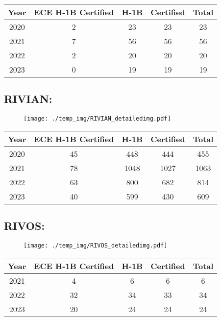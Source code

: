 \documentclass{article}%
\begin{document}
%
\begin{longtable}{c|c|c|c|c}%
\hline%
Year&ECE H{-}1B Certified&H{-}1B&Certified&Total\\%
\hline%
2020&2&23&23&23\\%
\hline%
2021&7&56&56&56\\%
\hline%
2022&2&20&20&20\\%
\hline%
2023&0&19&19&19\\%
\hline%
\end{longtable}

%
\newpage%
\subsection{RIVIAN:}%
\label{subsec:RIVIAN}%
\label{RIVIANdetailed}%


\begin{figure}[htbp]%
\centering%
\texttt{[image: ./temp\_img/RIVIAN\_detailedimg.pdf]}%
\end{figure}

%
\begin{longtable}{c|c|c|c|c}%
\hline%
Year&ECE H{-}1B Certified&H{-}1B&Certified&Total\\%
\hline%
2020&45&448&444&455\\%
\hline%
2021&78&1048&1027&1063\\%
\hline%
2022&63&800&682&814\\%
\hline%
2023&40&599&430&609\\%
\hline%
\end{longtable}

%
\newpage%
\subsection{RIVOS:}%
\label{subsec:RIVOS}%
\label{RIVOSdetailed}%


\begin{figure}[htbp]%
\centering%
\texttt{[image: ./temp\_img/RIVOS\_detailedimg.pdf]}%
\end{figure}

%
\begin{longtable}{c|c|c|c|c}%
\hline%
Year&ECE H{-}1B Certified&H{-}1B&Certified&Total\\%
\hline%
2021&4&6&6&6\\%
\hline%
2022&32&34&33&34\\%
\hline%
2023&20&24&24&24\\%
\hline%
\end{longtable}
\end{document}
